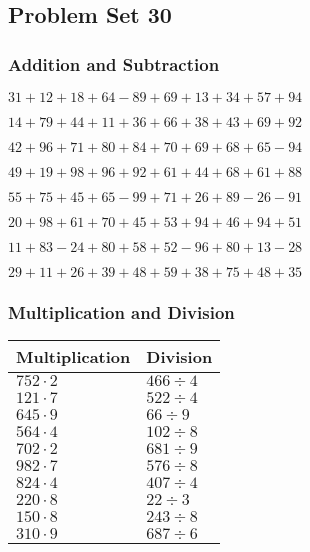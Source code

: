 \hypertarget{problem-set-30}{%
\subsection{Problem Set 30}\label{problem-set-30}}

\hypertarget{addition-and-subtraction}{%
\subsubsection{Addition and
Subtraction}\label{addition-and-subtraction}}

\(31+12+18+64-89+69+13+34+57+94\)

\(14+79+44+11+36+66+38+43+69+92\)

\(42+96+71+80+84+70+69+68+65-94\)

\(49+19+98+96+92+61+44+68+61+88\)

\(55+75+45+65-99+71+26+89-26-91\)

\(20+98+61+70+45+53+94+46+94+51\)

\(11+83-24+80+58+52-96+80+13-28\)

\(29+11+26+39+48+59+38+75+48+35\)

\hypertarget{multiplication-and-division}{%
\subsubsection{Multiplication and
Division}\label{multiplication-and-division}}

\begin{longtable}[]{@{}ll@{}}
\toprule
Multiplication & Division\tabularnewline
\midrule
\endhead
\(752\cdot2\) & \(466÷4\)\tabularnewline
\(121\cdot7\) & \(522÷4\)\tabularnewline
\(645\cdot9\) & \(66÷9\)\tabularnewline
\(564\cdot4\) & \(102÷8\)\tabularnewline
\(702\cdot2\) & \(681÷9\)\tabularnewline
\(982\cdot7\) & \(576÷8\)\tabularnewline
\(824\cdot4\) & \(407÷4\)\tabularnewline
\(220\cdot8\) & \(22÷3\)\tabularnewline
\(150\cdot8\) & \(243÷8\)\tabularnewline
\(310\cdot9\) & \(687÷6\)\tabularnewline
\bottomrule
\end{longtable}
